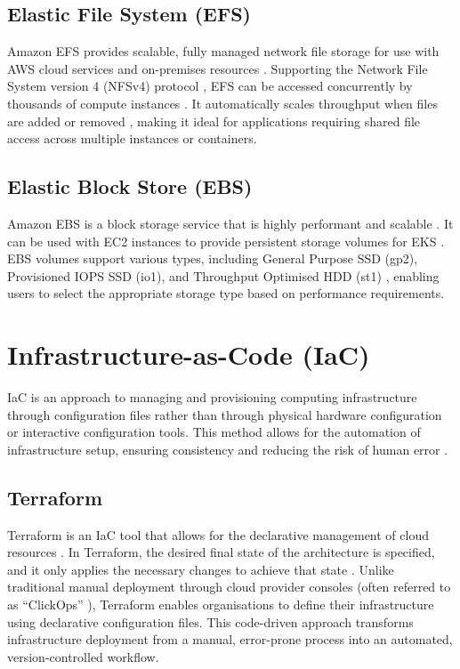 \subsection{Elastic File System (EFS)}
Amazon EFS provides scalable, fully managed network file storage for use with AWS cloud services and on-premises resources \cite{efs_definition}. Supporting the Network File System version 4 (NFSv4) protocol \cite{efs_work}, EFS can be accessed concurrently by thousands of compute instances \cite{efs_performance}. It automatically scales throughput when files are added or removed \cite{efs_performance}, making it ideal for applications requiring shared file access across multiple instances or containers.

\subsection{Elastic Block Store (EBS)}
Amazon EBS is a block storage service that is highly performant and scalable \cite{ebs_definition}. It can be used with EC2 instances to provide persistent storage volumes for EKS \cite{ebs_with_eks}. EBS volumes support various types, including General Purpose SSD (gp2), Provisioned IOPS SSD (io1), and Throughput Optimised HDD (st1) \cite{ebs_types}, enabling users to select the appropriate storage type based on performance requirements.

\section{Infrastructure-as-Code (IaC)}
IaC is an approach to managing and provisioning computing infrastructure through configuration files rather than through physical hardware configuration or interactive configuration tools. This method allows for the automation of infrastructure setup, ensuring consistency and reducing the risk of human error \cite{iac_benefits}.

\subsection{Terraform}
Terraform is an IaC tool that allows for the declarative management of cloud resources \cite{terraform_hashicorp}. In Terraform, the desired final state of the architecture is specified, and it only applies the necessary changes to achieve that state \cite{terraform_declarative}. Unlike traditional manual deployment through cloud provider consoles (often referred to as “ClickOps” \cite{clickops}), Terraform enables organisations to define their infrastructure using declarative configuration files. This code-driven approach transforms infrastructure deployment from a manual, error-prone process into an automated, version-controlled workflow.

